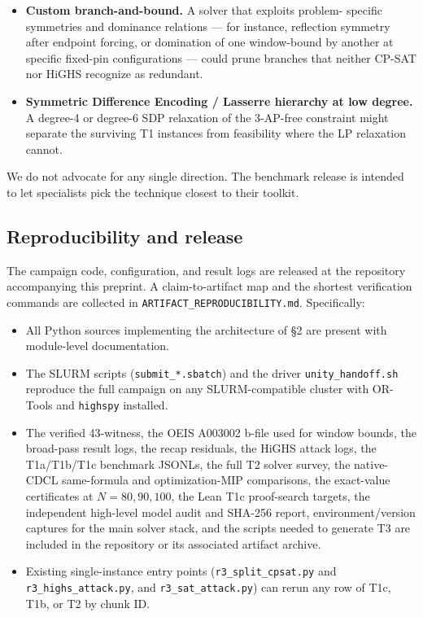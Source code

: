 \begin{itemize}
  These files are intended as a starting point for an A003002 / $r_3(N)$ entry
  in formal-conjecture repositories \cite{formal-conjectures}. Recent AlphaProof Nexus-style workflows
  have resolved Erdős problems of comparable complexity at low per-problem cost
  when a Lean target exists \cite{tsoukalas-alphaproof-nexus-2026}, so T1c is well-shaped for that workflow.
\item
  \textbf{Custom branch-and-bound.} A solver that exploits problem-
  specific symmetries and dominance relations --- for instance,
  reflection symmetry after endpoint forcing, or domination of one
  window-bound by another at specific fixed-pin configurations ---
  could prune branches that neither CP-SAT nor HiGHS recognize as
  redundant.
\item
  \textbf{Symmetric Difference Encoding / Lasserre hierarchy at low
  degree.} A degree-4 or degree-6 SDP relaxation of the
  3-AP-free constraint might separate the surviving T1 instances
  from feasibility where the LP relaxation cannot.
\end{itemize}

We do not advocate for any single direction. The benchmark release
is intended to let specialists pick the technique closest to their
toolkit.

\subsection{Reproducibility and release}\label{reproducibility-and-release}

The campaign code, configuration, and result logs are released at
the repository accompanying this preprint. A claim-to-artifact map and the
shortest verification commands are collected in
\texttt{ARTIFACT\_REPRODUCIBILITY.md}. Specifically:

\begin{itemize}
\tightlist
\item
  All Python sources implementing the architecture of §2 are present
  with module-level documentation.
\item
  The SLURM scripts (\texttt{submit\_*.sbatch}) and the driver
  \texttt{unity\_handoff.sh} reproduce the full campaign on any
  SLURM-compatible cluster with OR-Tools and \texttt{highspy} installed.
\item
  The verified 43-witness, the OEIS A003002 b-file used for window
  bounds, the broad-pass result logs, the recap residuals, the
  HiGHS attack logs, the T1a/T1b/T1c benchmark JSONLs, the full T2 solver
  survey, the native-CDCL same-formula and optimization-MIP comparisons, the
  exact-value certificates at $N=80,90,100$, the Lean T1c proof-search
  targets, the independent high-level model audit and SHA-256 report,
  environment/version captures for the main solver stack, and the scripts
  needed to generate T3 are included in the repository or its associated
  artifact archive.
\item
  Existing single-instance entry points (\texttt{r3\_split\_cpsat.py} and
  \texttt{r3\_highs\_attack.py}, and \texttt{r3\_sat\_attack.py}) can rerun any row of T1c,
  T1b, or T2 by chunk ID.
\end{itemize}

